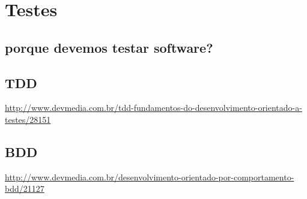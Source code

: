 \chapter{Testes}

\section{porque devemos testar software?}

\section{TDD}

\url{http://www.devmedia.com.br/tdd-fundamentos-do-desenvolvimento-orientado-a-testes/28151}

\section{BDD}

\url{http://www.devmedia.com.br/desenvolvimento-orientado-por-comportamento-bdd/21127}
